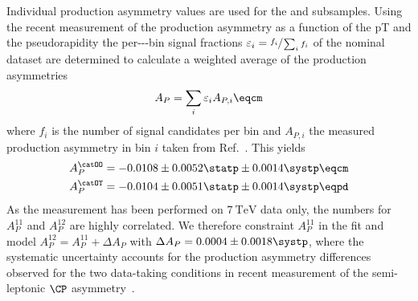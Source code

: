 Individual production asymmetry values are used for the \catOO and \catOT
subsamples. Using the recent \LHCb measurement \cite{Aaij:2014bba} of the
production asymmetry as a function of the \acf{pT} and the \acf{pseudorapidity}
the per-\pT-\pseudorapidity-bin signal fractions $\varepsilon_i =
\sfrac{f_i}{\sum_i f_i}$ of the nominal dataset are determined to calculate a
weighted average of the production asymmetries
%
\begin{equation}
  A_P = \sum_i \varepsilon_i A_{P,i}\eqcm
\end{equation}
where $f_i$ is the number of signal candidates per bin and $A_{P,i}$ the
measured production asymmetry in bin $i$ taken from Ref.~\cite{Aaij:2014bba}.
This yields
%
\begin{equation}
  \begin{split}
    A_P^{\catOO} &= -0.0108 \pm 0.0052 \statp \pm 0.0014 \systp \eqcm \\
    A_P^{\catOT} &= -0.0104 \pm 0.0051 \statp \pm 0.0014 \systp \eqpd \\
  \end{split}
\end{equation}
%
As the measurement has been performed on $\SI{7}{\TeV}$ data only, the numbers for
$A_P^{11}$ and $A_P^{12}$ are highly correlated. We therefore
constraint $A_P^{11}$ in the fit and model $A_P^{12} = A_P^{11} +
\Delta A_P$ with $\Delta A_P = 0.0004 \pm 0.0018 \systp$, where
the systematic uncertainty accounts for the production asymmetry differences
observed for the two data-taking conditions in  recent measurement of
the semi-leptonic $\CP$ asymmetry~\cite{Aaij:2014nxa}.
%

